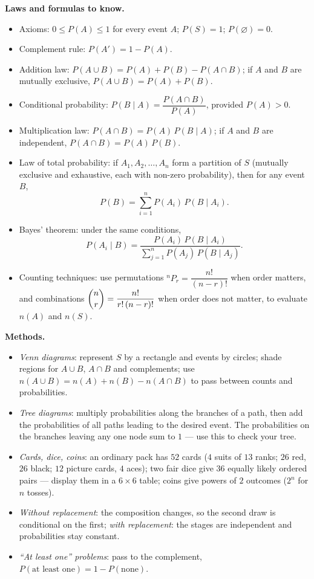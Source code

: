 \documentclass[11pt]{article}
\begin{document}
\begin{aretenir}
\textbf{Laws and formulas to know.}
\begin{itemize}
\item Axioms: $0\le P(A)\le 1$ for every event $A$; $P(S)=1$; $P(\varnothing)=0$.
\item Complement rule: $P(A')=1-P(A)$.
\item Addition law: $P(A\cup B)=P(A)+P(B)-P(A\cap B)$; if $A$ and $B$ are mutually exclusive, $P(A\cup B)=P(A)+P(B)$.
\item Conditional probability: $P(B\mid A)=\dfrac{P(A\cap B)}{P(A)}$, provided $P(A)>0$.
\item Multiplication law: $P(A\cap B)=P(A)\,P(B\mid A)$; if $A$ and $B$ are independent, $P(A\cap B)=P(A)\,P(B)$.
\item Law of total probability: if $A_1,A_2,\dots,A_n$ form a partition of $S$ (mutually exclusive and exhaustive, each with non-zero probability), then for any event $B$,
\[ P(B)=\sum_{i=1}^{n} P(A_i)\,P(B\mid A_i). \]
\item Bayes' theorem: under the same conditions,
\[ P(A_i\mid B)=\frac{P(A_i)\,P(B\mid A_i)}{\displaystyle\sum_{j=1}^{n} P(A_j)\,P(B\mid A_j)}. \]
\item Counting techniques: use permutations ${}^nP_r=\dfrac{n!}{(n-r)!}$ when order matters, and combinations $\dbinom{n}{r}=\dfrac{n!}{r!\,(n-r)!}$ when order does not matter, to evaluate $n(A)$ and $n(S)$.
\end{itemize}

\textbf{Methods.}
\begin{itemize}
\item \emph{Venn diagrams}: represent $S$ by a rectangle and events by circles; shade regions for $A\cup B$, $A\cap B$ and complements; use $n(A\cup B)=n(A)+n(B)-n(A\cap B)$ to pass between counts and probabilities.
\item \emph{Tree diagrams}: multiply probabilities along the branches of a path, then add the probabilities of all paths leading to the desired event. The probabilities on the branches leaving any one node sum to $1$ --- use this to check your tree.
\item \emph{Cards, dice, coins}: an ordinary pack has $52$ cards ($4$ suits of $13$ ranks; $26$ red, $26$ black; $12$ picture cards, $4$ aces); two fair dice give $36$ equally likely ordered pairs --- display them in a $6\times 6$ table; coins give powers of $2$ outcomes ($2^n$ for $n$ tosses).
\item \emph{Without replacement}: the composition changes, so the second draw is conditional on the first; \emph{with replacement}: the stages are independent and probabilities stay constant.
\item \emph{``At least one'' problems}: pass to the complement, $P(\text{at least one})=1-P(\text{none})$.
\end{itemize}


\end{aretenir}
\end{document}
